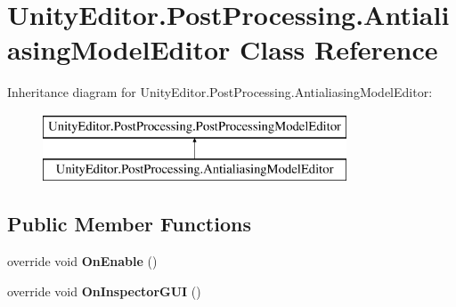 \hypertarget{class_unity_editor_1_1_post_processing_1_1_antialiasing_model_editor}{}\section{Unity\+Editor.\+Post\+Processing.\+Antialiasing\+Model\+Editor Class Reference}
\label{class_unity_editor_1_1_post_processing_1_1_antialiasing_model_editor}
Inheritance diagram for Unity\+Editor.\+Post\+Processing.\+Antialiasing\+Model\+Editor\+:\begin{figure}[H]
\begin{center}
\leavevmode
\includegraphics[height=2.000000cm]{class_unity_editor_1_1_post_processing_1_1_antialiasing_model_editor}
\end{center}
\end{figure}
\subsection*{Public Member Functions}
\begin{DoxyCompactItemize}
\item 
\mbox{\label{class_unity_editor_1_1_post_processing_1_1_antialiasing_model_editor_a197f83799bb72c6f98ac55c058daa2d0}} 
override void {\bfseries On\+Enable} ()
\item 
\mbox{\label{class_unity_editor_1_1_post_processing_1_1_antialiasing_model_editor_a6309384162ac175322d6dcc44d0c2e0d}} 
override void {\bfseries On\+Inspector\+G\+UI} ()
\end{DoxyCompactItemize}
